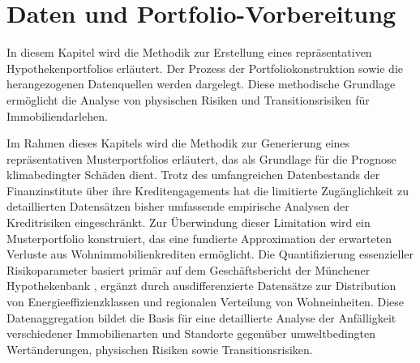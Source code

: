 \section{Daten und Portfolio-Vorbereitung}

In diesem Kapitel wird die Methodik zur Erstellung eines repräsentativen Hypothekenportfolios erläutert. Der Prozess der Portfoliokonstruktion sowie die herangezogenen Datenquellen werden dargelegt. Diese methodische Grundlage ermöglicht die Analyse von physischen Risiken und Transitionsrisiken für Immobiliendarlehen.

Im Rahmen dieses Kapitels wird die Methodik zur Generierung eines repräsentativen Musterportfolios erläutert, das als Grundlage für die Prognose klimabedingter Schäden dient. Trotz des umfangreichen Datenbestands der Finanzinstitute über ihre Kreditengagements hat die limitierte Zugänglichkeit zu detaillierten Datensätzen bisher umfassende empirische Analysen der Kreditrisiken eingeschränkt. Zur Überwindung dieser Limitation wird ein Musterportfolio konstruiert, das eine fundierte Approximation der erwarteten Verluste aus Wohnimmobilienkrediten ermöglicht. Die Quantifizierung essenzieller Risikoparameter basiert primär auf dem Geschäftsbericht der Münchener Hypothekenbank \parencite{MuenchenerHyp2022}, ergänzt durch ausdifferenzierte Datensätze zur Distribution von Energieeffizienzklassen und regionalen Verteilung von Wohneinheiten. Diese Datenaggregation bildet die Basis für eine detaillierte Analyse der Anfälligkeit verschiedener Immobilienarten und Standorte gegenüber umweltbedingten Wertänderungen, physischen Risiken sowie Transitionsrisiken.





